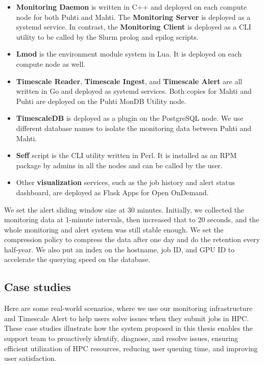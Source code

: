 \begin{itemize}
    \item \textbf{Monitoring Daemon} is written in C++ and deployed on each compute node for both Puhti and Mahti. The \textbf{Monitoring Server} is deployed as a systemd service. In contrast, the \textbf{Monitoring Client} is deployed as a CLI utility to be called by the Slurm prolog and epilog scripts.
    \item \textbf{Lmod} is the environment module system in Lua. It is deployed on each compute node as well.
    \item \textbf{Timescale Reader}, \textbf{Timescale Ingest}, and \textbf{Timescale Alert} are all written in Go and deployed as systemd services. Both copies for Mahti and Puhti are deployed on the Puhti MonDB Utility node.
    \item \textbf{TimescaleDB} is deployed as a plugin on the PostgreSQL node. We use different database names to isolate the monitoring data between Puhti and Mahti.
    \item \textbf{Seff} script is the CLI utility written in Perl. It is installed as an RPM package by admins in all the nodes and can be called by the user.
    \item Other \textbf{visualization} services, such as the job history and alert status dashboard, are deployed as Flask Apps for Open OnDemand.
\end{itemize}

We set the alert sliding window size at 30 minutes. Initially, we collected the monitoring data at 1-minute intervals, then increased that to 20 seconds, and the whole monitoring and alert system was still stable enough. We set the compression policy to compress the data after one day and do the retention every half-year. We also put an index on the hostname, job ID, and GPU ID to accelerate the querying speed on the database.

\subsection{Case studies}
Here are some real-world scenarios, where we use our monitoring infrastructure and Timescale Alert to help users solve issues when they submit jobs in HPC. These case studies illustrate how the system proposed in this thesis enables the support team to proactively identify, diagnose, and resolve issues, ensuring efficient utilization of HPC resources, reducing user queuing time, and improving user satisfaction.

